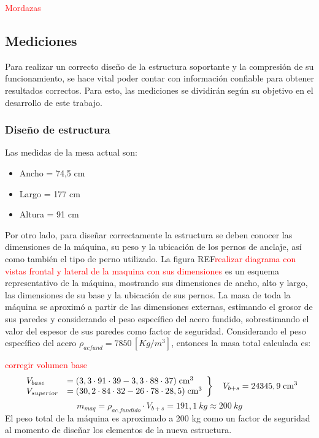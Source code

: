 \textcolor{red}{Mordazas}
\subsection{Mediciones}
Para realizar un correcto diseño de la estructura soportante y la compresión de su funcionamiento, se hace vital poder contar con información confiable para obtener resultados correctos. Para esto, las mediciones se dividirán según su objetivo en el desarrollo de este trabajo.
\subsubsection{Diseño de estructura}
Las medidas de la mesa actual son: 
\begin{itemize}
	\item Ancho = 74,5 cm
	\item Largo = 177 cm
	\item Altura = 91 cm
\end{itemize}
Por otro lado, para diseñar correctamente la estructura se deben conocer las dimensiones de la máquina, su peso y la ubicación de los pernos de anclaje, así como también el tipo de perno utilizado. La figura REF\textcolor{red}{realizar diagrama con vistas frontal y lateral de la maquina con sus dimensiones} es un esquema representativo de la máquina, mostrando sus dimensiones de ancho, alto y largo, las dimensiones de su base y la ubicación de sus pernos. La masa de toda la máquina se aproximó a partir de las dimensiones externas, estimando el grosor de sus paredes y considerando el peso específico del acero fundido, sobrestimando el valor del espesor de sus paredes como factor de seguridad. Considerando el peso específico del acero $\rho_{acfund} = 7850 \, [Kg/m^3]$, entonces la masa total calculada es:

\textcolor{red}{corregir volumen base}
\[ \left. 
\begin{array}{ll}
V_{base} &= (3,3\cdot 91\cdot 39 - 3,3\cdot 88\cdot 37)\; \text{cm}^3	\\
V_{superior} &=(30,2\cdot 84\cdot 32 - 26\cdot 78\cdot 28,5) \; \text{cm}^3	\\
\end{array}
\right\} \\
\quad V_{b+s} = 24345,9 \; \text{cm}^3 \]
\begin{equation}
	m_{maq} = \rho_{ac. fundido} \cdot V_{b+s} = 191,1 \: kg \approx 200 \: kg
\end{equation}
El peso total de la máquina es aproximado a 200 kg como un factor de seguridad al momento de diseñar los elementos de la nueva estructura.

